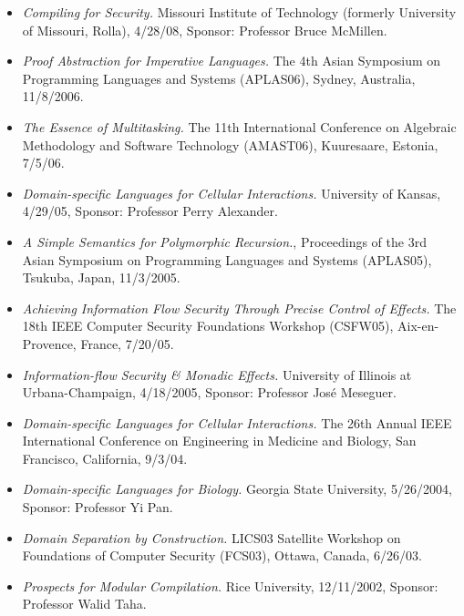 \documentclass[11pt]{article}
\begin{document}
\begin{itemize}[leftmargin=0mm]

\item[]{\it Compiling for Security.} Missouri Institute of Technology (formerly University of Missouri, Rolla), 4/28/08, Sponsor: Professor Bruce McMillen.

\item[]{\it Proof Abstraction for Imperative Languages.} The 4th Asian Symposium on Programming Languages and Systems (APLAS06), Sydney, Australia, 11/8/2006. 

\item[]{\it The Essence of Multitasking.} The 11th International Conference on Algebraic Methodology and Software Technology (AMAST06), Kuuresaare, Estonia, 7/5/06.

\item[]{\it Domain-specific Languages for Cellular Interactions.} University of Kansas, 4/29/05, Sponsor: Professor Perry Alexander. 

\item[]{\it A Simple Semantics for Polymorphic Recursion.}, Proceedings of the 3rd Asian Symposium on Programming Languages and Systems (APLAS05), Tsukuba, Japan, 11/3/2005.

\item[]{\it Achieving Information Flow Security Through Precise Control of Effects.} The 18th IEEE Computer Security Foundations Workshop (CSFW05), Aix-en-Provence, France, 7/20/05.

\item[]{\it Information-flow Security \& Monadic Effects.}
University of Illinois at Urbana-Champaign, 4/18/2005, Sponsor:
Professor Jos\'{e} Meseguer.

\item[]{\it Domain-specific Languages for Cellular Interactions.} The 26th Annual IEEE International Conference on Engineering in Medicine and Biology, San Francisco, California, 9/3/04.

\item[]{\it Domain-specific Languages for Biology.} Georgia State
  University, 5/26/2004, Sponsor: Professor Yi Pan.

\item[]{\it Domain Separation by Construction.} LICS03 Satellite Workshop on Foundations of Computer Security (FCS03), Ottawa, Canada, 6/26/03. 

\item[]{\it Prospects for Modular Compilation.}
Rice University, 12/11/2002, Sponsor: Professor Walid Taha.


\end{itemize}
\end{document}
